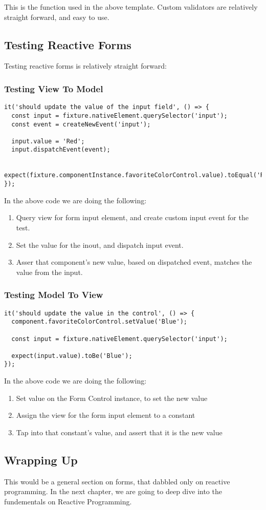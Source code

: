 This is the function used in the above template. Custom validators are 
relatively straight forward, and easy to use. 

\subsection{ Testing Reactive Forms }
Testing reactive forms is relatively straight forward: 

\subsubsection{ Testing View To Model }

\begin{lstlisting}[caption=Testing View to Model]
it('should update the value of the input field', () => {
  const input = fixture.nativeElement.querySelector('input');
  const event = createNewEvent('input');

  input.value = 'Red';
  input.dispatchEvent(event);

  expect(fixture.componentInstance.favoriteColorControl.value).toEqual('Red');
});
\end{lstlisting}

In the above code we are doing the following: 
\begin{enumerate}
  \item Query view for form input element, and create custom input event for
  the test.
  \item Set the value for the inout, and dispatch input event.
  \item Asser that component's new value, based on dispatched event, matches
  the value from the input. 
\end{enumerate}

\subsubsection{ Testing Model To View }

\begin{lstlisting}
it('should update the value in the control', () => {
  component.favoriteColorControl.setValue('Blue');

  const input = fixture.nativeElement.querySelector('input');

  expect(input.value).toBe('Blue');
});
\end{lstlisting}

In the above code we are doing the following: 
\begin{enumerate}
  \item Set value on the Form Control instance, to set the new value 
  \item Assign the view for the form input element to a constant
  \item Tap into that constant's value, and assert that it is the new value
\end{enumerate}

\subsection{ Wrapping Up }
This would be a general section on forms, that dabbled only on reactive 
programming. In the next chapter, we are going to deep dive into the
fundementals on Reactive Programming. 

